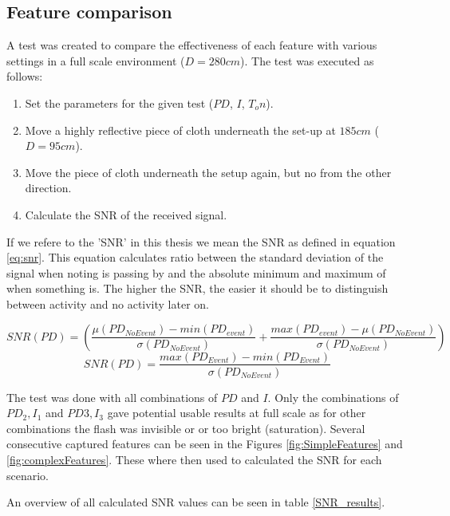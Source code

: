 \subsection{Feature comparison}
A test was created to compare the effectiveness of each feature with various settings in a full scale environment ($D = 280cm$). The test was executed as follows:
\begin{enumerate}[itemsep=-1ex]
	\item Set the parameters for the given test ($PD$, $I$, $T_on$).
	\item Move a highly reflective piece of cloth underneath the set-up at $185cm$ ($D = 95cm$).
	\item Move the piece of cloth underneath the setup again, but no from the other direction.
	\item Calculate the SNR of the received signal.
\end{enumerate}
If we refere to the 'SNR' in this thesis we mean the SNR as defined in equation \ref{eq:snr}. This equation calculates ratio between the standard deviation of the signal when noting is passing by and the absolute minimum and maximum of when something is. The higher the SNR, the easier it should be to distinguish between activity and no activity later on.

\begin{equation}
SNR(PD) = \left(\frac{\mu(PD_{NoEvent}) - min(PD_{event})}{\sigma(PD_{NoEvent})} + \frac{ max(PD_{event}) - \mu(PD_{NoEvent})}{\sigma(PD_{NoEvent})}\right)
\end{equation}
\begin{equation}
\label{eq:snr}
SNR(PD) = \frac{max(PD_{Event}) - min(PD_{Event})}{\sigma(PD_{NoEvent})} 
\end{equation}

The test was done with all combinations of $PD$ and $I$. Only the combinations of $PD_2, I_{1}$ and $PD3, I_{3}$ gave potential usable results at full scale as for other combinations the flash was invisible or or too bright (saturation). Several consecutive captured features can be seen in the Figures \ref{fig:SimpleFeatures} and \ref{fig:complexFeatures}. These where then used to calculated the SNR for each scenario. 

An overview of all calculated SNR values can be seen in table \ref{SNR_results}. 

